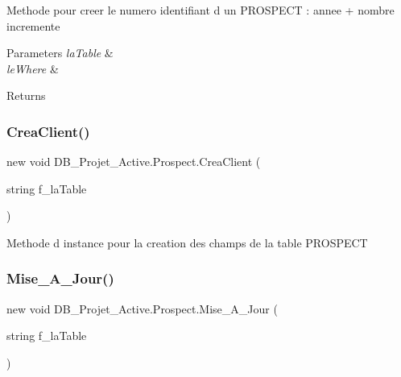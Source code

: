 Methode pour creer le numero identifiant d un P\+R\+O\+S\+P\+E\+CT \+: annee + nombre incremente 


\begin{DoxyParams}{Parameters}
{\em la\+Table} & \\
\hline
{\em le\+Where} & \\
\hline
\end{DoxyParams}
\begin{DoxyReturn}{Returns}

\end{DoxyReturn}
\mbox{\label{class_d_b___projet___active_1_1_prospect_aae2d7697d10fdaf537f54be852b6d692}} 
\subsubsection{\texorpdfstring{CreaClient()}{CreaClient()}}
{\footnotesize\ttfamily new void D\+B\+\_\+\+Projet\+\_\+\+Active.\+Prospect.\+Crea\+Client (\begin{DoxyParamCaption}\item[{string}]{f\+\_\+la\+Table }\end{DoxyParamCaption})}



Methode d instance pour la creation des champs de la table P\+R\+O\+S\+P\+E\+CT 

\mbox{\label{class_d_b___projet___active_1_1_prospect_a1498a3cd63fe5363c14e0570eb02185c}} 
\subsubsection{\texorpdfstring{Mise\_A\_Jour()}{Mise\_A\_Jour()}}
{\footnotesize\ttfamily new void D\+B\+\_\+\+Projet\+\_\+\+Active.\+Prospect.\+Mise\+\_\+\+A\+\_\+\+Jour (\begin{DoxyParamCaption}\item[{string}]{f\+\_\+la\+Table }\end{DoxyParamCaption})}



